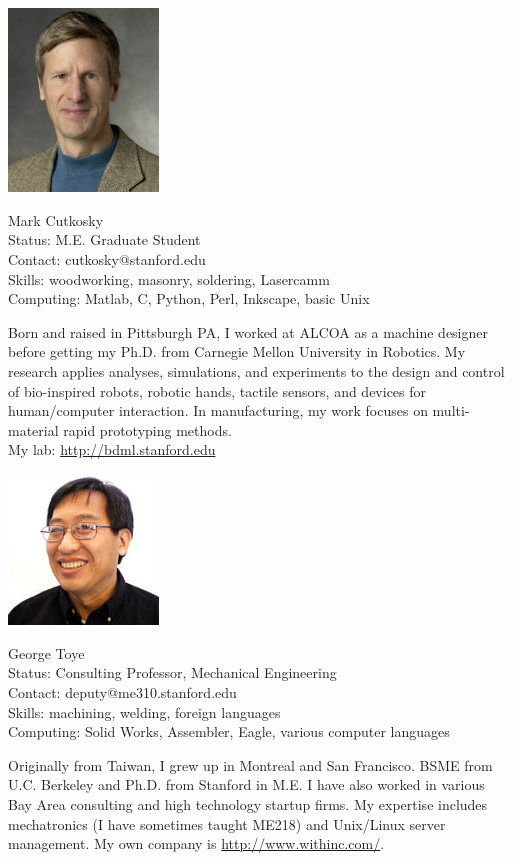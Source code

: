 \begin{framed}
\noindent \includegraphics[width=40mm]{Figures/Ch2/MarkCutkosky}
\parbox[b]{0.6\textwidth}{Mark Cutkosky\\
Status: M.E. Graduate Student\\
Contact: cutkosky@stanford.edu\\
Skills: woodworking, masonry, soldering, Lasercamm\\
Computing: Matlab, C, Python, Perl, Inkscape, basic Unix\\
}

Born and raised in Pittsburgh PA, I worked at ALCOA as a machine designer before getting my Ph.D. from Carnegie Mellon University in Robotics. My research applies analyses, simulations, and experiments to the design and control of bio-inspired robots, robotic hands, tactile sensors, and devices for human/computer interaction. In manufacturing, my work focuses on multi-material rapid prototyping methods. \\
My lab: \url{http://bdml.stanford.edu}

\end{framed}

\begin{framed}
\noindent \includegraphics[width=40mm]{Figures/Ch2/GeorgeToye}
\parbox[b]{0.6\textwidth}{George Toye\\
Status: Consulting Professor, Mechanical Engineering\\
Contact: deputy@me310.stanford.edu\\
Skills: machining, welding, foreign languages\\
Computing: Solid Works, Assembler, Eagle, various computer languages\\
}

Originally from Taiwan, I grew up in Montreal and San Francisco.  BSME from U.C. Berkeley and Ph.D. from Stanford in M.E. I have also worked in various Bay Area consulting and high technology startup firms. My expertise includes mechatronics (I have sometimes taught ME218) and Unix/Linux server management.  My own company is  \url{http://www.withinc.com/}.

\end{framed}

